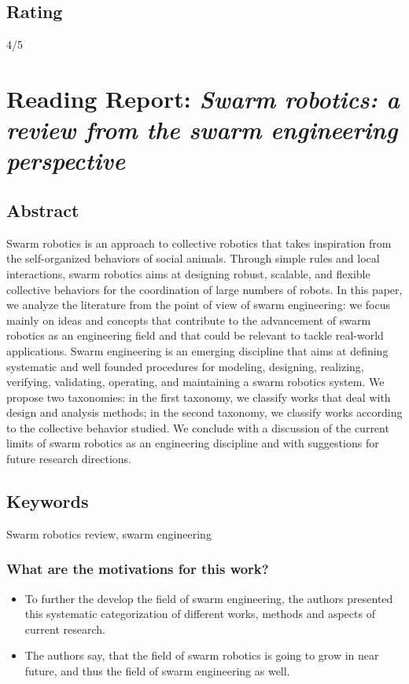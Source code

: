     \subsection*{Rating}
    4/5
    
    
    \newpage
    \section{Reading Report: \emph{Swarm robotics: a review from the swarm engineering perspective}}
    \cite{Brambilla2013}
    
    \subsection*{Abstract}
    Swarm robotics is an approach to collective robotics that takes inspiration from
    the self-organized behaviors of social animals. Through simple rules and local interactions,
    swarm robotics aims at designing robust, scalable, and flexible collective behaviors for the
    coordination of large numbers of robots. In this paper, we analyze the literature from the
    point of view of swarm engineering: we focus mainly on ideas and concepts that contribute
    to the advancement of swarm robotics as an engineering field and that could be relevant
    to tackle real-world applications. Swarm engineering is an emerging discipline that aims at
    defining systematic and well founded procedures for modeling, designing, realizing, verifying, validating, operating, and maintaining a swarm robotics system. We propose two
    taxonomies: in the first taxonomy, we classify works that deal with design and analysis
    methods; in the second taxonomy, we classify works according to the collective behavior
    studied. We conclude with a discussion of the current limits of swarm robotics as an engineering discipline and with suggestions for future research directions.
    
    \subsection*{Keywords}
    Swarm robotics review, swarm engineering
    
    
     
    \subsubsection*{What are the motivations for this work?}
    \begin{itemize}
        \item To further the develop the field of swarm engineering, the authors presented this systematic categorization of different works, methods and aspects of current research.
        \item The authors say, that the field of swarm robotics is going to grow in near future, and thus the field of swarm engineering as well.
    \end{itemize}

